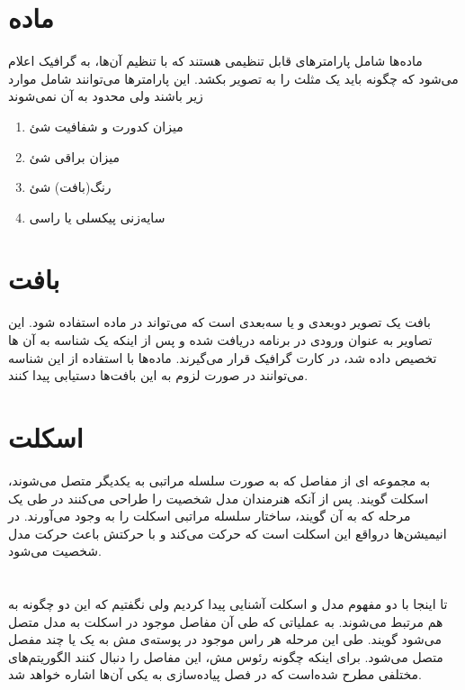 \section{ماده 
\protect{}
}
ماده‌ها شامل پارامتر‌های قابل تنظیمی هستند که با تنظیم آن‌ها، به گرافیک اعلام می‌شود که چگونه باید یک مثلث را به تصویر بکشد.
این پارامترها می‌توانند شامل موارد زیر باشند ولی محدود به آن نمی‌شوند

\begin{enumerate}
	\item میزان کدورت و شفافیت شئ
 	\item میزان براقی شئ
 	\item رنگ(بافت) شئ
 	\item سایه‌زنی پیکسلی یا راسی \protect{}
\end{enumerate}


\section{بافت
\protect{}
}
بافت یک تصویر دوبعدی و یا سه‌بعدی است که می‌تواند در ماده استفاده شود.
این تصاویر به عنوان ورودی در برنامه دریافت شده و پس از اینکه یک شناسه به آن ها تخصیص داده شد، در کارت گرافیک قرار می‌گیرند. ماده‌ها با استفاده از این شناسه می‌توانند در صورت لزوم به این بافت‌ها دستیابی پیدا کنند.


\section{اسکلت}

به مجمو‌عه ای از مفاصل که به صورت سلسله مراتبی به یکدیگر متصل می‌شوند، اسکلت گویند. پس از آنکه هنرمندان مدل شخصیت را طراحی می‌کنند در طی یک مرحله که به آن
گویند، ساختار سلسله مراتبی اسکلت را به وجود می‌آورند.
در انیمیشن‌ها درواقع این اسکلت‌ است که حرکت می‌کند و با حرکتش باعث حرکت مدل شخصیت می‌شود.


\section{
}

تا اینجا با دو مفهوم مدل و اسکلت آشنایی پیدا کردیم ولی نگفتیم که این دو چگونه به هم مرتبط می‌شوند.
به عملیاتی که طی آن مفاصل موجود در اسکلت به مدل متصل می‌شود 
گویند.
طی این مرحله هر راس موجود در پوسته‌ی مش به یک یا چند مفصل متصل می‌شود.
برای اینکه چگونه رئوس مش، این مفاصل را دنبال کنند الگوریتم‌های مختلفی مطرح شده‌است که در فصل پیاده‌سازی به یکی آن‌ها اشاره ‌خواهد شد.


